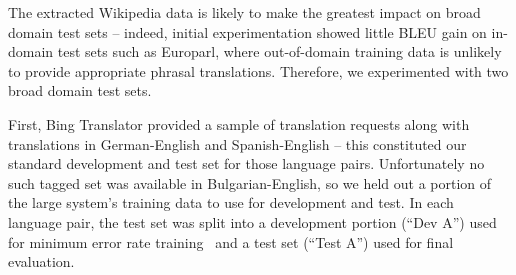 \documentclass[11pt,letterpaper]{article}
\begin{document}
The extracted Wikipedia data is likely to make the greatest impact on broad
domain test sets -- indeed, initial experimentation showed little BLEU gain
on in-domain test sets such as Europarl, where out-of-domain training data
is unlikely to provide appropriate phrasal translations.  Therefore, we
experimented with two broad domain test sets.

First, Bing Translator provided a sample of translation
requests along with translations in German-English and
Spanish-English -- this constituted our standard development and
test set for those language pairs.  Unfortunately no such tagged
set was available in Bulgarian-English, so we held out a portion
of the large system's training data to use for development and
test. In each language pair, the test set was split into a
development portion (``Dev A'') used for minimum error rate
training~\cite{OchMert03} and a test set (``Test A'') used
for final evaluation.
\end{document}
